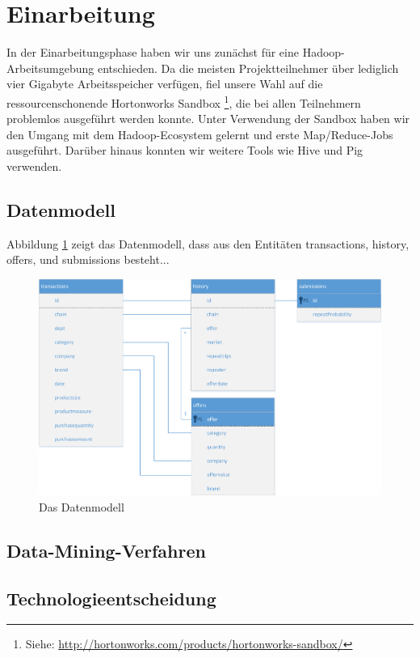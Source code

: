 \section{Einarbeitung}
In der Einarbeitungsphase haben wir uns zunächst für eine Hadoop-Arbeitsumgebung entschieden. Da die meisten Projektteilnehmer über lediglich vier Gigabyte Arbeitsspeicher verfügen, fiel unsere Wahl auf die ressourcenschonende Hortonworks Sandbox \footnote{Siehe: \url{http://hortonworks.com/products/hortonworks-sandbox/}}, die bei allen Teilnehmern problemlos ausgeführt werden konnte. Unter Verwendung der Sandbox haben wir den Umgang mit dem Hadoop-Ecosystem gelernt und erste Map/Reduce-Jobs ausgeführt. Darüber hinaus konnten wir weitere Tools wie Hive und Pig verwenden.

\subsection{Datenmodell}
Abbildung \ref{fig:ShoppersTables} zeigt das Datenmodell, dass aus den Entitäten transactions, history, offers, und submissions besteht...
\begin{figure}[h]
\centering
\includegraphics[width=0.7\linewidth]{Bilder/ShoppersTables}
\caption{Das Datenmodell}
\label{fig:ShoppersTables}
\end{figure}





\subsection{Data-Mining-Verfahren}

\subsection{Technologieentscheidung}
